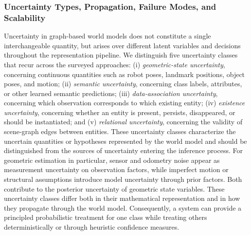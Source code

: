 \subsubsection{Uncertainty Types, Propagation, Failure Modes, and Scalability}\label{sec:uncertainty_types}
Uncertainty in graph-based world models does not constitute a single interchangeable quantity, but arises over different latent variables and decisions throughout the representation pipeline.
We distinguish five uncertainty classes that recur across the surveyed approaches: (i) \textit{geometric-state uncertainty}, concerning continuous quantities such as robot poses, landmark positions, object poses, and motion; (ii) \textit{semantic uncertainty}, concerning class labels, attributes, or other learned semantic predictions; (iii) \textit{data-association uncertainty}, concerning which observation corresponds to which existing entity; (iv) \textit{existence uncertainty}, concerning whether an entity is present, persists, disappeared, or should be instantiated; and (v) \textit{relational uncertainty}, concerning the validity of scene-graph edges between entities. 
These uncertainty classes characterize the uncertain quantities or hypotheses represented by the world model and should be distinguished from the sources of uncertainty entering the inference process. 
For geometric estimation in particular, sensor and odometry noise appear as measurement uncertainty on observation factors, while imperfect motion or structural assumptions introduce model uncertainty through prior factors. 
Both contribute to the posterior uncertainty of geometric state variables.
These uncertainty classes differ both in their mathematical representation and in how they propagate through the world model.
Consequently, a system can provide a principled probabilistic treatment for one class while treating others deterministically or through heuristic confidence measures.

